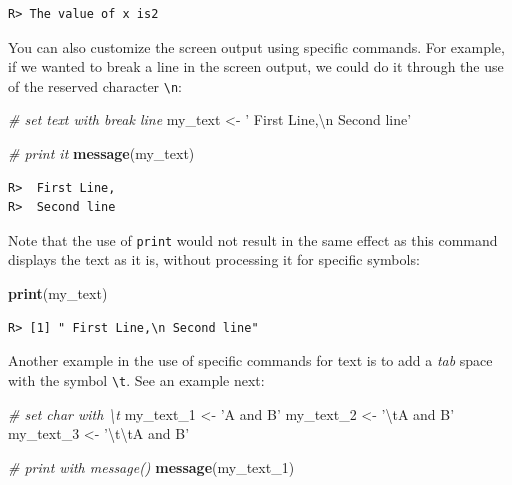 \documentclass[
  12pt,
]{book}
\newenvironment{Shaded}{\begin{snugshade}}{\end{snugshade}}
\newcommand{\CharTok}[1]{\textcolor[rgb]{0.5,0.5,0.5}{#1}}
\newcommand{\CommentTok}[1]{\textcolor[rgb]{0.37,0.37,0.37}{\textit{#1}}}
\newcommand{\DecValTok}[1]{\textcolor[rgb]{0.06,0.06,0.06}{#1}}
\newcommand{\KeywordTok}[1]{\textcolor[rgb]{0.27,0.27,0.27}{\textbf{#1}}}
\newcommand{\NormalTok}[1]{#1}
\newcommand{\StringTok}[1]{\textcolor[rgb]{0.5,0.5,0.5}{#1}}
\begin{document}
\begin{verbatim}
R> The value of x is2
\end{verbatim}

You can also customize the screen output using specific commands. For example, if we wanted to break a line in the screen output, we could do it through the use of the reserved character \texttt{\textbackslash{}n}:

\begin{Shaded}
\begin{Highlighting}[]
\CommentTok{# set text with break line}
\NormalTok{my_text <-}\StringTok{ ' First Line,}\CharTok{\textbackslash{}n}\StringTok{ Second line'}

\CommentTok{# print it}
\KeywordTok{message}\NormalTok{(my_text)}
\end{Highlighting}
\end{Shaded}

\begin{verbatim}
R>  First Line,
R>  Second line
\end{verbatim}

Note that the use of \texttt{print} would not result in the same effect as this command displays the text as it is, without processing it for specific symbols:

\begin{Shaded}
\begin{Highlighting}[]
\KeywordTok{print}\NormalTok{(my_text)}
\end{Highlighting}
\end{Shaded}

\begin{verbatim}
R> [1] " First Line,\n Second line"
\end{verbatim}

Another example in the use of specific commands for text is to add a \emph{tab} space with the symbol \texttt{\textbackslash{}t}. See an example next:

\begin{Shaded}
\begin{Highlighting}[]
\CommentTok{# set char with \textbackslash{}t}
\NormalTok{my_text_}\DecValTok{1}\NormalTok{ <-}\StringTok{ 'A and B'}
\NormalTok{my_text_}\DecValTok{2}\NormalTok{ <-}\StringTok{ '}\CharTok{\textbackslash{}t}\StringTok{A and B'}
\NormalTok{my_text_}\DecValTok{3}\NormalTok{ <-}\StringTok{ '}\CharTok{\textbackslash{}t\textbackslash{}t}\StringTok{A and B'}

\CommentTok{# print with message()}
\KeywordTok{message}\NormalTok{(my_text_}\DecValTok{1}\NormalTok{)}
\end{Highlighting}
\end{Shaded}
\end{document}
